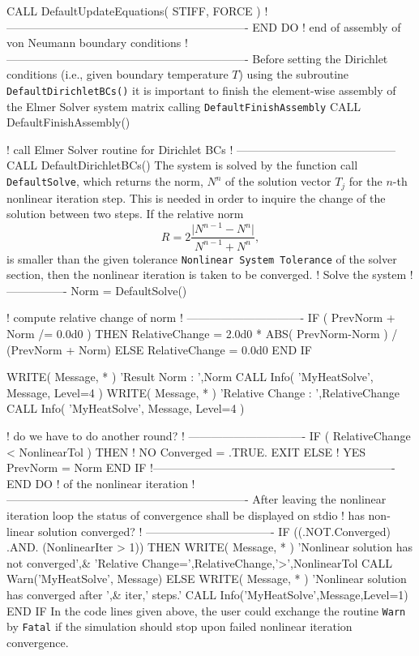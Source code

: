         CALL DefaultUpdateEquations( STIFF, FORCE )
!----------------------------------------------------------------
     END DO ! end of assembly of von Neumann boundary conditions
!----------------------------------------------------------------
\ttend
Before setting the Dirichlet conditions (i.e., given boundary temperature $T$) using the subroutine \texttt{DefaultDirichletBCs()} it is important to finish the element-wise assembly of the Elmer Solver system matrix calling \texttt{DefaultFinishAssembly}
\ttbegin
     CALL DefaultFinishAssembly()

     ! call Elmer Solver routine for Dirichlet BCs
     ! ------------------------------------------
     CALL DefaultDirichletBCs()
\ttend
The system is solved by the function call \texttt{DefaultSolve}, which returns the norm, $N^{n}$ of the solution vector $T_{j}$ for the $n$-th nonlinear iteration step. This is needed in order to inquire the change of the solution between two steps. If the relative norm
\begin{displaymath}
R = 2\frac{\vert N^{n-1} - N^{n}\vert}{N^{n-1} + N^{n}},
\end{displaymath}
is smaller than the given tolerance \texttt{Nonlinear System Tolerance} of the solver section, then the nonlinear iteration is taken to be converged.
\ttbegin
     ! Solve the system
     ! ----------------
     Norm = DefaultSolve()

     ! compute relative change of norm
     ! -------------------------------
     IF ( PrevNorm + Norm /= 0.0d0 ) THEN
        RelativeChange = 2.0d0 * ABS( PrevNorm-Norm ) / (PrevNorm + Norm)
     ELSE
        RelativeChange = 0.0d0
     END IF

     WRITE( Message, * ) 'Result Norm   : ',Norm
     CALL Info( 'MyHeatSolve', Message, Level=4 )
     WRITE( Message, * ) 'Relative Change : ',RelativeChange
     CALL Info( 'MyHeatSolve', Message, Level=4 )


     ! do we have to do another round?
     ! -------------------------------
     IF ( RelativeChange < NonlinearTol ) THEN  ! NO
        Converged = .TRUE.
        EXIT
     ELSE ! YES
        PrevNorm = Norm        
     END IF
!----------------------------------------------------------------
  END DO ! of the nonlinear iteration
!----------------------------------------------------------------
\ttend
After leaving the nonlinear iteration loop the status of convergence shall be displayed on stdio
\ttbegin
  ! has non-linear solution converged?
  ! ----------------------------------
  IF ((.NOT.Converged) .AND. (NonlinearIter > 1)) THEN 
     WRITE( Message, * ) 'Nonlinear solution has not converged',&
          'Relative Change=',RelativeChange,'>',NonlinearTol
     CALL Warn('MyHeatSolve', Message)
  ELSE
     WRITE( Message, * ) 'Nonlinear solution has converged after ',&
          iter,' steps.'
     CALL Info('MyHeatSolve',Message,Level=1)
  END IF
\ttend
In the code lines given above, the user could exchange the routine \texttt{Warn} by \texttt{Fatal} if the simulation should stop upon failed nonlinear iteration convergence.

